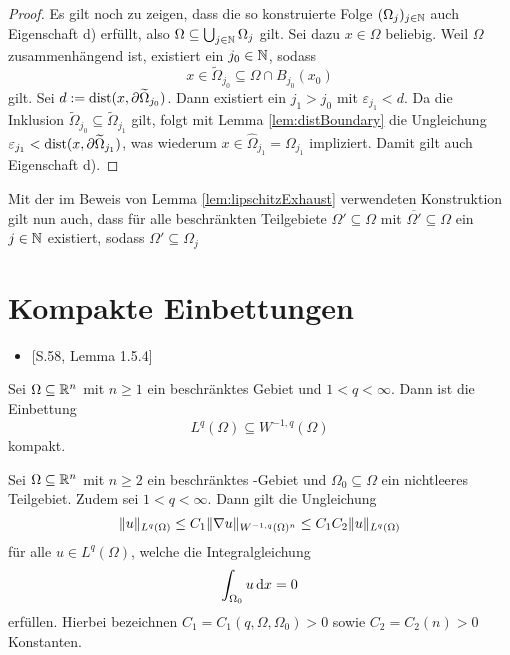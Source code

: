 \begin{proof}
  Es gilt noch zu zeigen, dass die so konstruierte Folge $(\Omega_j)_{j \in \mathbb{N}}$ auch Eigenschaft d) erfüllt, also $ \Omega \subseteq \bigcup_{j \in \mathbb{N}} \Omega_j $ gilt.
  Sei dazu $x \in \Omega$ beliebig.
  Weil $\Omega$ zusammenhängend ist, existiert ein $j_0 \in \mathbb{N}$, sodass
  $$
  x \in \widetilde\Omega_{j_0} \subseteq \Omega \cap B_{j_0}(x_0)
  $$
  gilt.
  Sei $d:=\operatorname{dist}(x, \partial\widetilde\Omega_{j_0})$.
  Dann existiert ein $j_1 > j_0$ mit $\varepsilon_{j_1} < d$.
  Da die Inklusion $\widetilde\Omega_{j_0} \subseteq \widetilde\Omega_{j_1}$ gilt, folgt mit Lemma \ref{lem:distBoundary} die Ungleichung $\varepsilon_{j_1} < \operatorname{dist}(x,\partial\widetilde\Omega_{j_1})$, was wiederum $x \in \widehat\Omega_{j_1} = \Omega_{j_1}$ impliziert.
  Damit gilt auch Eigenschaft d).
\end{proof}

\begin{bemnumber}
  \label{bem:boundedSubset}
  Mit der im Beweis von Lemma \ref{lem:lipschitzExhaust} verwendeten Konstruktion gilt nun auch, dass für alle beschränkten Teilgebiete $\Omega' \subseteq \Omega$ mit $\overline{\Omega'} \subseteq \Omega$ ein $j \in \mathbb{N}$ existiert, sodass $\Omega' \subseteq \Omega_j$
\end{bemnumber}

\section{Kompakte Einbettungen}

\begin{itemize}
  \item \cite{sohr2001navier}[S.58, Lemma 1.5.4]
\end{itemize}

\begin{lem}
  \label{lem:compactEmbedding0}
  Sei $\Omega \subseteq \mathbb{R}^n$ mit $n \geq 1$ ein beschränktes Gebiet und $1 < q < \infty$.
  Dann ist die Einbettung
  $$
  L^q(\Omega) \subseteq W^{-1,q}(\Omega)
  $$
  kompakt.
\end{lem}

\begin{lem}
  \label{lem:compactEmbedding}
  Sei $\Omega \subseteq \mathbb{R}^n$ mit $n \geq 2$ ein beschränktes \lipschitz\hyp{}Gebiet und $\Omega_0 \subseteq \Omega$ ein nichtleeres Teilgebiet.
  Zudem sei $1 < q < \infty$.
  Dann gilt die Ungleichung
  $$
  \lVert u \rVert_{L^q(\Omega)} 
  \leq C_1 \lVert \nabla u \rVert_{W^{-1,q}(\Omega)^n}
  \leq C_1 C_2 \lVert u \rVert_{L^q(\Omega)}
  $$
  für alle $u \in L^q(\Omega)$, welche die Integralgleichung
  $$
  \int_{\Omega_0} u \, {\operatorname{d}\!{x}} = 0
  $$
  erfüllen.
  Hierbei bezeichnen $C_1 = C_1(q, \Omega, \Omega_0) > 0$ sowie $C_2 = C_2(n) > 0$ Konstanten.
\end{lem}

